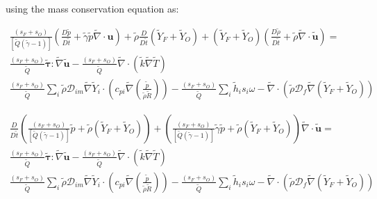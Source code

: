 \documentclass[preprint,12pt,authoryear]{elsarticle}
\begin{document}
using the mass conservation equation as:

\begin{equation}
\begin{split}
	\frac{(s_F+s_O)}{[\tilde{Q}(\tilde{\gamma}-1)]}
	\left(
        	\frac{D \tilde{p}}{D\tilde{t}}
		+
		\tilde{\gamma}
		\tilde{p} 
		\tilde{\nabla}\cdot{\mathbf{u}}
	\right)
	+
	\tilde{\rho} \frac{D  }{D \tilde{t}}(\tilde{Y}_F+\tilde{Y}_O)
	+
	(\tilde{Y}_F+\tilde{Y}_O)
	\left(
		\frac{D  \tilde{\rho} }{D \tilde{t}}
		+
		\tilde{\rho} 
		\tilde{\nabla}\cdot\tilde{\mathbf{u}}
	\right)
        =
	\\
	\frac{(s_F+s_O)}{\tilde{Q}}
        \pmb{\tilde{\tau}}:\tilde{\nabla} \tilde{\mathbf{u}} 
        - 
	\frac{(s_F+s_O)}{\tilde{Q}}
        \tilde{\nabla} \cdot (\tilde{k}\tilde{\nabla} \tilde{T})
	\\
	\frac{(s_F+s_O)}{\tilde{Q}}
        \sum\limits_i 
        \tilde{\rho}
        \mathcal{D}_{im}
        \tilde{\nabla}
        \tilde{Y}_i     
        \cdot
        \left(
                c_{pi}
                \tilde{\nabla}
                \left(
                	\frac{\tilde{p}}{\tilde{\rho}\tilde{R}}
                \right)
        \right)
	-
	\frac{(s_F+s_O)}{\tilde{Q}}
        \sum\limits_i
	\tilde{h}_i
        s_i \omega	
	-
	\tilde{\nabla}\cdot( \tilde{\rho} \mathcal{D}_f\tilde{\nabla} (\tilde{Y}_F+\tilde{Y}_O))
\end{split}
\end{equation}

\begin{equation}
\begin{split}
        \frac{D }{D\tilde{t}}
	\left(
		\frac{(s_F+s_O)}{[\tilde{Q}(\tilde{\gamma}-1)]}
		\tilde{p}
		+
		\tilde{\rho} (\tilde{Y}_F+\tilde{Y}_O)
	\right)
	+
	\left(
		\frac{(s_F+s_O)}{[\tilde{Q}(\tilde{\gamma}-1)]}
		\tilde{\gamma}
		\tilde{p} 
		+
		\tilde{\rho} 
		(\tilde{Y}_F+\tilde{Y}_O)
	\right)
	\tilde{\nabla}\cdot\tilde{\mathbf{u}}
        =
	\\
	\frac{(s_F+s_O)}{\tilde{Q}}
        \pmb{\tilde{\tau}}:\tilde{\nabla} \tilde{\mathbf{u}} 
        - 
	\frac{(s_F+s_O)}{\tilde{Q}}
        \tilde{\nabla} \cdot (\tilde{k}\tilde{\nabla} \tilde{T})
	\\
	\frac{(s_F+s_O)}{\tilde{Q}}
        \sum\limits_i 
        \tilde{\rho}
        \mathcal{D}_{im}
        \tilde{\nabla}
        \tilde{Y}_i     
        \cdot
        \left(
                c_{pi}
                \tilde{\nabla}
                \left(
                	\frac{\tilde{p}}{\tilde{\rho}\tilde{R}}
                \right)
        \right)
	-
	\frac{(s_F+s_O)}{\tilde{Q}}
        \sum\limits_i
	\tilde{h}_i
        s_i \omega	
	-
	\tilde{\nabla}\cdot( \tilde{\rho} \mathcal{D}_f\tilde{\nabla} (\tilde{Y}_F+\tilde{Y}_O))
\end{split}
\end{equation}
\end{document}
